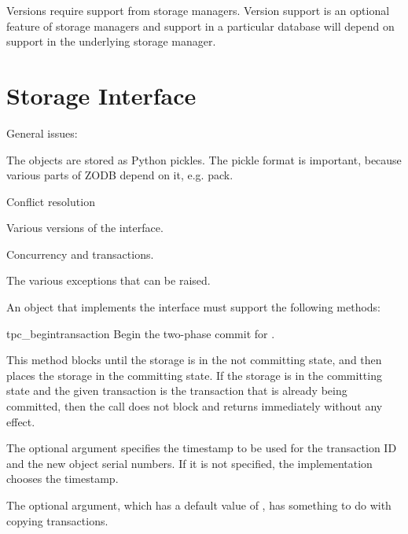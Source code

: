 \documentclass{howto}
\begin{document}
Versions require support from storage managers. Version support is an
optional feature of storage managers and support in a particular
database will depend on support in the underlying storage manager.


\section{Storage Interface}

General issues:

The objects are stored as Python pickles.  The pickle format is
important, because various parts of ZODB depend on it, e.g. pack.

Conflict resolution

Various versions of the interface.

Concurrency and transactions.

The various exceptions that can be raised.

An object that implements the  interface must support
the following methods:

\begin{methoddesc}{tpc_begin}{transaction}
  Begin the two-phase commit for .

  This method blocks until the storage is in the not committing state,
  and then places the storage in the committing state. If the storage
  is in the committing state and the given transaction is the
  transaction that is already being committed, then the call does not
  block and returns immediately without any effect.

  The optional  argument specifies the timestamp to be used
  for the transaction ID and the new object serial numbers.  If it is
  not specified, the implementation chooses the timestamp.

  The optional  argument, which has a default value of
  , has something to do with copying transactions.
\end{methoddesc}
\end{document}
